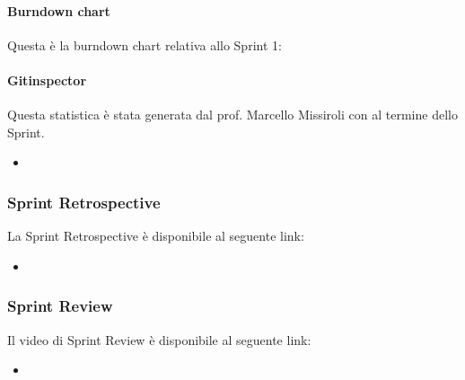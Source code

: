 \documentclass[letterpaper,10pt,italian]{sphinxmanual}
\begin{document}
\paragraph{Burndown chart}
\label{\detokenize{development/sprint1/index:burndown-chart}}
\sphinxAtStartPar
Questa è la burndown chart relativa allo Sprint 1:

\noindent{}


\paragraph{Gitinspector}
\label{\detokenize{development/sprint1/index:gitinspector}}
\sphinxAtStartPar
Questa statistica è stata generata dal prof. Marcello Missiroli con
 al termine dello Sprint.
\begin{itemize}
\item {} 
\sphinxAtStartPar
{}

\end{itemize}


\subsubsection{Sprint Retrospective}
\label{\detokenize{development/sprint1/index:sprint-retrospective}}
\sphinxAtStartPar
La Sprint Retrospective è disponibile al seguente link:
\begin{itemize}
\item {} 
\sphinxAtStartPar
{}

\end{itemize}


\subsubsection{Sprint Review}
\label{\detokenize{development/sprint1/index:sprint-review}}
\sphinxAtStartPar
Il video di Sprint Review è disponibile al seguente link:
\begin{itemize}
\item {} 
\sphinxAtStartPar
{}

\end{itemize}
\end{document}
